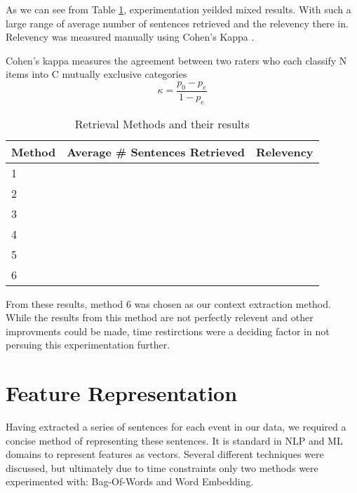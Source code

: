 \documentclass[bsc,frontabs,twoside,singlespacing,parskip,deptreport]{infthesis}     %
\begin{document}

As we can see from Table \ref{table:retrieval}, experimentation yeilded mixed results.
With such a large range of average number of sentences retrieved and the relevency there in.
Relevency was measured manually using Cohen's Kappa \cite{}.

Cohen's kappa measures the agreement between two raters who each classify N items into C mutually exclusive categories
\begin{equation}
  \kappa = \frac{p_{0} - p_{e}}{1 - p_{e}}
  \end{equation}

\begin{table}[h]
\centering
\caption{Retrieval Methods and their results}
\label{table:retrieval}
\begin{tabular}{|l|l|l|}
  \hline
Method & Average \# Sentences Retrieved & Relevency \\
\hline
1      &                                &           \\
2      &                                &           \\
3      &                                &           \\
4      &                                &           \\
5      &                                &           \\
6      &                                &           \\        
\hline
\end{tabular}
\end{table}

From these results, method 6 was chosen as our context extraction method. While the
results from this method are not perfectly relevent and other improvments could be made,
time restirctions were a deciding factor in not persuing this experimentation further.

\section{Feature Representation}\label{sec:representation}
Having extracted a series of sentences for each event in our data, we required a concise method
of representing these sentences. It is standard in NLP and ML domains to represent features as vectors.
Several different techniques were discussed, but ultimately due to time constraints only two methods were
experimented with: Bag-Of-Words and Word Embedding.
\end{document}
